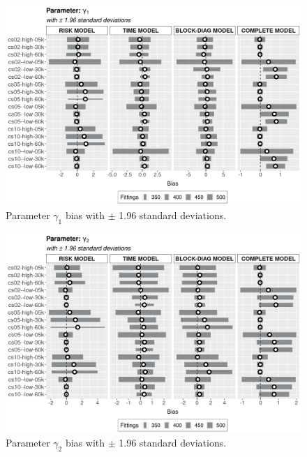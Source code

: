 \documentclass[a4paper,12pt]{article}
\begin{document}
\begin{figure}[H]
 \centering
 \includegraphics[width=\linewidth]{../../THESIS/thesis/figures/bias2plotsd-3.png}
 \vspace{-0.75cm}
 \caption{Parameter \(\gamma_{1}\) bias with \(\pm\) 1.96 standard
   deviations.}
 \label{fig:biassdgama1}
\end{figure}

\begin{figure}[H]
 \centering
 \includegraphics[width=\linewidth]{../../THESIS/thesis/figures/bias2plotsd-4.png}
 \vspace{-0.75cm}
 \caption{Parameter \(\gamma_{2}\) bias with \(\pm\) 1.96 standard
   deviations.}
 \label{fig:biassdgama2}
\end{figure}
\end{document}
